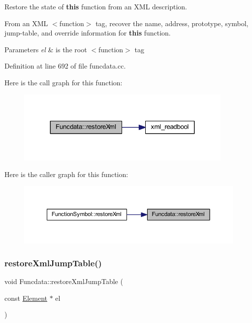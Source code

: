 Restore the state of {\bfseries{this}} function from an X\+ML description. 

From an X\+ML $<$function$>$ tag, recover the name, address, prototype, symbol, jump-\/table, and override information for {\bfseries{this}} function. 
\begin{DoxyParams}{Parameters}
{\em el} & is the root $<$function$>$ tag \\
\hline
\end{DoxyParams}


Definition at line 692 of file funcdata.\+cc.

Here is the call graph for this function\+:
\nopagebreak
\begin{figure}[H]
\begin{center}
\leavevmode
\includegraphics[width=299pt]{class_funcdata_a40da83020eebf723001109c64407cef4_cgraph}
\end{center}
\end{figure}
Here is the caller graph for this function\+:
\nopagebreak
\begin{figure}[H]
\begin{center}
\leavevmode
\includegraphics[width=350pt]{class_funcdata_a40da83020eebf723001109c64407cef4_icgraph}
\end{center}
\end{figure}
\mbox{\label{class_funcdata_a07a41bb91dd51c9a76d8f6d1e2f09328}} 
\subsubsection{\texorpdfstring{restoreXmlJumpTable()}{restoreXmlJumpTable()}}
{\footnotesize\ttfamily void Funcdata\+::restore\+Xml\+Jump\+Table (\begin{DoxyParamCaption}\item[{const \mbox{\hyperlink{class_element}{Element}} $\ast$}]{el }\end{DoxyParamCaption})}



